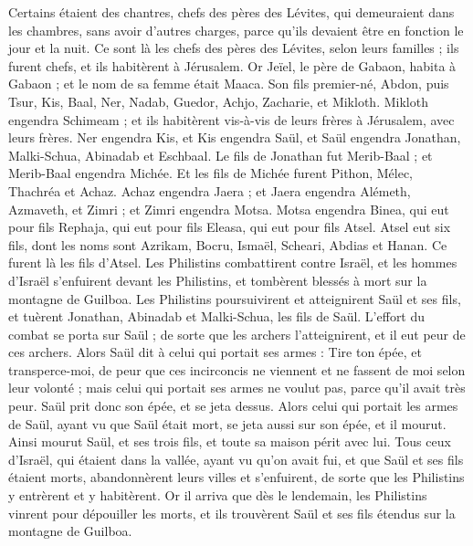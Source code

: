 \begin{multicols}{2}
Certains étaient des chantres, chefs des pères des Lévites, qui demeuraient dans les chambres, sans avoir d'autres charges, parce qu'ils devaient être en fonction le jour et la nuit.
Ce sont là les chefs des pères des Lévites, selon leurs familles ; ils furent chefs, et ils habitèrent à Jérusalem.
Or Jeïel, le père de Gabaon, habita à Gabaon ; et le nom de sa femme était Maaca.
Son fils premier-né, Abdon, puis Tsur, Kis, Baal, Ner, Nadab,
Guedor, Achjo, Zacharie, et Mikloth.
Mikloth engendra Schimeam ; et ils habitèrent vis-à-vis de leurs frères à Jérusalem, avec leurs frères.
Ner engendra Kis, et Kis engendra Saül, et Saül engendra Jonathan, Malki-Schua, Abinadab et Eschbaal.
Le fils de Jonathan fut Merib-Baal ; et Merib-Baal engendra Michée.
Et les fils de Michée furent Pithon, Mélec, Thachréa et Achaz.
Achaz engendra Jaera ; et Jaera engendra Alémeth, Azmaveth, et Zimri ; et Zimri engendra Motsa.
Motsa engendra Binea, qui eut pour fils Rephaja, qui eut pour fils Eleasa, qui eut pour fils Atsel.
Atsel eut six fils, dont les noms sont Azrikam, Bocru, Ismaël, Scheari, Abdias et Hanan. Ce furent là les fils d'Atsel.
\VerseOne{}Les Philistins combattirent contre Israël, et les hommes d'Israël s'enfuirent devant les Philistins, et tombèrent blessés à mort sur la montagne de Guilboa.
Les Philistins poursuivirent et atteignirent Saül et ses fils, et tuèrent Jonathan, Abinadab et Malki-Schua, les fils de Saül.
L'effort du combat se porta sur Saül ; de sorte que les archers l'atteignirent, et il eut peur de ces archers.
Alors Saül dit à celui qui portait ses armes : Tire ton épée, et transperce-moi, de peur que ces incirconcis ne viennent et ne fassent de moi selon leur volonté ; mais celui qui portait ses armes ne voulut pas, parce qu'il avait très peur. Saül prit donc son épée, et se jeta dessus.
Alors celui qui portait les armes de Saül, ayant vu que Saül était mort, se jeta aussi sur son épée, et il mourut.
Ainsi mourut Saül, et ses trois fils, et toute sa maison périt avec lui.
Tous ceux d'Israël, qui étaient dans la vallée, ayant vu qu'on avait fui, et que Saül et ses fils étaient morts, abandonnèrent leurs villes et s'enfuirent, de sorte que les Philistins y entrèrent et y habitèrent.
Or il arriva que dès le lendemain, les Philistins vinrent pour dépouiller les morts, et ils trouvèrent Saül et ses fils étendus sur la montagne de Guilboa.

\end{multicols}
